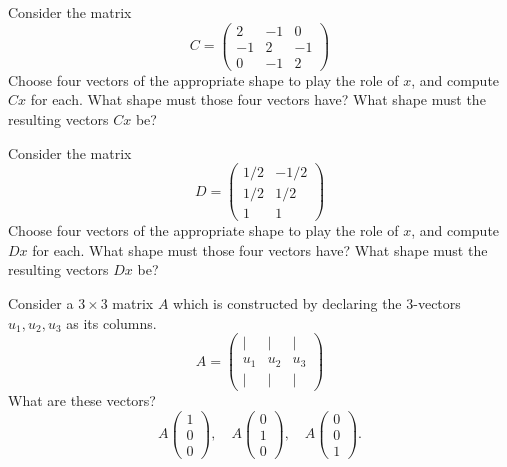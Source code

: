 \documentclass[cahier-main.tex]{subfiles}
\begin{document}
\begin{task}
Consider the matrix 
\[
C = \begin{pmatrix} 2 & -1 & 0\\ -1 & 2 & -1 \\ 0 & -1 & 2 \end{pmatrix}
\]
Choose four vectors of the appropriate shape to play the role of $x$, and compute $Cx$ for each. What shape must those four vectors have? What shape must the resulting vectors $Cx$ be?
\end{task}

\begin{task}
Consider the matrix 
\[
D = \begin{pmatrix} 1/2 & -1/2 \\ 1/2 & 1/2 \\ 1 & 1 \end{pmatrix}
\]
Choose four vectors of the appropriate shape to play the role of $x$, and compute $Dx$ for each. What shape must those four vectors have? What shape must the resulting vectors $Dx$ be?
\end{task}

\begin{task}
Consider a $3\times 3$ matrix $A$ which is constructed by declaring the $3$-vectors $u_1, u_2, u_3$ as its columns.
\[
A = \begin{pmatrix} | & | & | \\ u_1 & u_2 & u_3 \\ | & | & | \end{pmatrix}
\]
What are these vectors?
\[
A\begin{pmatrix} 1 \\ 0 \\ 0 \end{pmatrix}, \quad A\begin{pmatrix} 0 \\ 1 \\ 0 \end{pmatrix}, \quad A\begin{pmatrix} 0 \\ 0 \\ 1 \end{pmatrix}. 
\]
\end{task}
\end{document}
